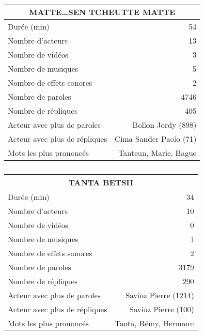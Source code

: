     \begin{table}[]
    \centering
    \caption{}
    \begin{tabular}{lr}\toprule\multicolumn{2}{c}{MATTE\ldots SEN TCHEUTTE MATTE} \\\midrule
\multicolumn{1}{l}{Durée (min)}&54\\
\multicolumn{1}{l}{Nombre d'acteurs}&13\\
\multicolumn{1}{l}{Nombre de vidéos}&3\\
\multicolumn{1}{l}{Nombre de musiques}&5\\
\multicolumn{1}{l}{Nombre de effets sonores}&2\\
\multicolumn{1}{l}{Nombre de paroles}&4746\\
\multicolumn{1}{l}{Nombre de répliques}&405\\
\multicolumn{1}{l}{Acteur avec plus de paroles}&Bollon Jordy (898)\\
\multicolumn{1}{l}{Acteur avec plus de répliques}&Cima Sander Paolo (71)\\
\multicolumn{1}{l}{Mots les plus prononcés}&Tanteun, Marie, Bague\\
    \bottomrule
    \end{tabular}%
    \end{table}
    \begin{table}[]
    \centering
    \caption{}
    \begin{tabular}{lr}\toprule\multicolumn{2}{c}{TANTA BETSII} \\\midrule
\multicolumn{1}{l}{Durée (min)}&34\\
\multicolumn{1}{l}{Nombre d'acteurs}&10\\
\multicolumn{1}{l}{Nombre de vidéos}&0\\
\multicolumn{1}{l}{Nombre de musiques}&1\\
\multicolumn{1}{l}{Nombre de effets sonores}&2\\
\multicolumn{1}{l}{Nombre de paroles}&3179\\
\multicolumn{1}{l}{Nombre de répliques}&290\\
\multicolumn{1}{l}{Acteur avec plus de paroles}&Savioz Pierre (1214)\\
\multicolumn{1}{l}{Acteur avec plus de répliques}&Savioz Pierre (100)\\
\multicolumn{1}{l}{Mots les plus prononcés}&Tanta, Rémy, Hermann\\
    \bottomrule
    \end{tabular}%
    \end{table}
